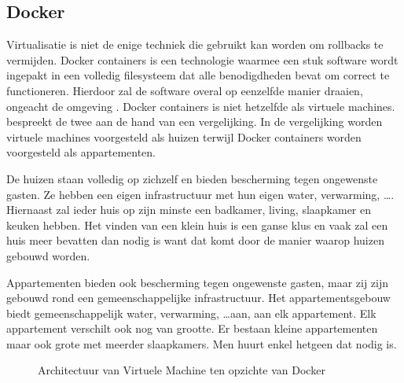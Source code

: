 
\subsection{Docker}\label{sec:docker}
Virtualisatie is niet de enige techniek die gebruikt kan worden om rollbacks te vermijden.
Docker containers is een technologie waarmee een stuk software wordt ingepakt in een volledig filesysteem dat alle benodigdheden bevat om correct te functioneren.
Hierdoor zal de software overal op eenzelfde manier draaien, ongeacht de omgeving \citep{dockerMain}.
Docker containers is niet hetzelfde als virtuele machines.
\citet{dockerEbook} bespreekt de twee aan de hand van een vergelijking.
In de vergelijking worden virtuele machines voorgesteld als huizen terwijl Docker containers worden voorgesteld als appartementen.

De huizen staan volledig op zichzelf en bieden bescherming tegen ongewenste gasten.
Ze hebben een eigen infrastructuur met hun eigen water, verwarming, \ldots .
Hiernaast zal ieder huis op zijn minste een badkamer, living, slaapkamer en keuken hebben.
Het vinden van een klein huis is een ganse klus en vaak zal een huis meer bevatten dan nodig is want dat komt door de manier waarop huizen gebouwd worden.

Appartementen bieden ook bescherming tegen ongewenste gasten, maar zij zijn gebouwd rond een gemeenschappelijke infrastructuur.
Het appartementsgebouw biedt gemeenschappelijk water, verwarming, \ldots  aan, aan elk appartement.
Elk appartement verschilt ook nog van grootte.
Er bestaan kleine appartementen maar ook grote met meerder slaapkamers.
Men huurt enkel hetgeen dat nodig is.

\begin{figure}[!ht]
\centering
{}
\caption{Architectuur van Virtuele Machine ten opzichte van Docker \citep{dockerMain}}
\label{fig:VMvsDocker}
\end{figure}


